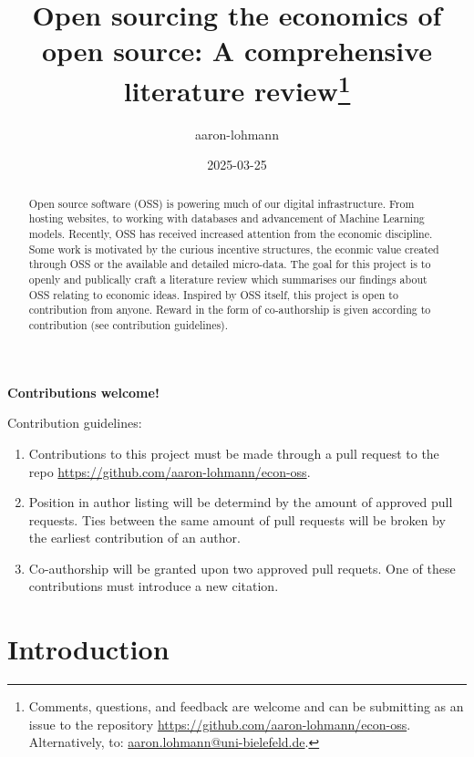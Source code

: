 \documentclass[
  12pt,
]{article}
\title{Open sourcing the economics of open source: A comprehensive
literature review\thanks{Comments, questions, and feedback are welcome
and can be submitting as an issue to the repository
\href{https://github.com/aaron-lohmann/econ-oss/issues}{https://github.com/aaron-lohmann/econ-oss}.
Alternatively, to:
\href{aaron.lohmann@uni-bielefeld.de}{aaron.lohmann@uni-bielefeld.de}.}}
\author{aaron-lohmann}
\date{2025-03-25}
\providecommand{\tightlist}{%
  \setlength{\itemsep}{0pt}\setlength{\parskip}{0pt}}\usepackage{longtable,booktabs,array}
\begin{document}
\maketitle
\begin{abstract}
Open source software (OSS) is powering much of our digital
infrastructure. From hosting websites, to working with databases and
advancement of Machine Learning models. Recently, OSS has received
increased attention from the economic discipline. Some work is motivated
by the curious incentive structures, the econmic value created through
OSS or the available and detailed micro-data. The goal for this project
is to openly and publically craft a literature review which summarises
our findings about OSS relating to economic ideas. Inspired by OSS
itself, this project is open to contribution from anyone. Reward in the
form of co-authorship is given according to contribution (see
contribution guidelines).
\end{abstract}

\begin{center}
\bf{Contributions welcome!}
\end{center}

Contribution guidelines:

\begin{enumerate}
\def\labelenumi{\arabic{enumi}.}
\tightlist
\item
  Contributions to this project must be made through a pull request to
  the repo \url{https://github.com/aaron-lohmann/econ-oss}.
\item
  Position in author listing will be determind by the amount of approved
  pull requests. Ties between the same amount of pull requests will be
  broken by the earliest contribution of an author.
\item
  Co-authorship will be granted upon two approved pull requets. One of
  these contributions must introduce a new citation.
\end{enumerate}

\newpage

\section{Introduction}\label{sec-introduction}
\end{document}
